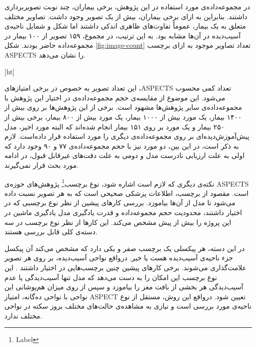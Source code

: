 در مجموعه‌داده‌ی مورد استفاده در این پژوهش، برخی بیماران، چند نوبت تصویربرداری داشتند.
بنابراین به ازای برخی بیماران، بیش از یک تصویر وجود داشت.
تصاویر مختلف متعلق به یک بیمار، عموماً تفاوت‌های ظاهری اندکی داشتند اما شکل و شمایل ناحیه‌ی آسیب‌دیده در آن‌ها مشابه بود.
به این ترتیب، در مجموع، ۱۵۹ تصویر از ۱۰۰ بیمار در مجموعه‌داده حاضر بودند.
شکل \ref{fig:image-count} 
تعداد تصاویر موجود 
به ازای برچسب ASPECTS را نشان می‌دهد.


[ht]

این تعداد تصویر به خصوص در برخی امتیاز‌های ،ASPECTS تعداد کمی محسوب می‌شود.
این موضوع از مقایسه‌ی حجم مجموعه‌داده‌ی در اختیار این پژوهش با مجموعه‌داده‌ی 
سایر پژوهش‌ها مشهود است.
برخی از این پژوهش‌ها 
\cite{upadhyay2022deep,chen2022improving}
بر روی 
بیش از ۱۴۰۰ بیمار، 
یک مورد
\cite{cao2022deep}
بیش از ۱۰۰۰ بیمار،
یک مورد
\cite{lee2023clinical}
بیش از ۸۰۰ بیمار،
برخی 
\cite{chiang2022deep,jung2018evaluating,kuang2019automated,kuang2021eis}
بیش از ۲۵۰ بیمار
و یک مورد 
\cite{naganuma2021alberta}
 بر روی ۱۵۱ بیمار 
انجام شده‌اند که البته مورد اخیر، مدل پیش‌آموزش‌دیده‌ای بر روی مجموعه‌داده‌ی دیگری را مورد استفاده قرار داده‌است.
لازم به ذکر است، در این بین، دو مورد
\cite{golkonda2022automated,yu2021automated}
نیز با حجم مجموعه‌داده‌ی ۷۷ و ۹۰ وجود دارد
که اولی به علت ارزیابی نادرست مدل و دومی به علت دقت‌های غیرقابل قبول، در ادامه مورد بحث قرار نمی‌گیرند.


نکته‌ی دیگری که لازم است اشاره شود، نوع 
برچسب\footnote{Label}
پژوهش‌های 
حوزه‌ی ASPECTS است.
مقصود از برچسب، اطلاعات پزشکی صحیحی است که به هر تصویر نسبت داده می‌شود تا مدل از آن‌ها بیاموزد.
بررسی کار‌های پیشین از نظر نوع برچسبی که در اختیار داشتند، محدودیت حجم مجموعه‌داده و قدرت یادگیری مدل یادگیری ماشین در این پروژه را بیش از پیش مشخص می‌کند.
این کار‌ها از نظر نوع برچسب در سه دسته‌ی کلی قابل بررسی هستند. 

در این دسته،
هر پیکسلی یک برچسب صفر و یکی دارد که مشخص می‌کند آن پیکسل جزء ناحیه‌ی آسیب‌دیده هست یا خیر.
درواقع نواحی آسیب‌دیده، بر روی هر تصویر علامت‌گذاری می‌شوند.
برخی کار‌های پیشین
چنین برچسب‌هایی در اختیار داشتند \cite{cao2022deep,upadhyay2022deep,kuang2021eis,chen2022improving}.
این نوع برچسب این امکان را به دست می‌دهد که مدل تنها آسیب‌دیدگی یا عدم آسیب‌دیدگی هر بخشی از بافت مغز را بیاموزد و سپس از روی میزان هم‌پوشانی این نواحی با نواحی ده‌گانه، امتیاز ASPECT تعیین شود.
درواقع این روش، مستقل از نوع ناحیه‌ی مورد بررسی است و نیازی به مشاهده‌ی حالت‌های مختلف بروز سکته در نواحی مختلف ندارد.

